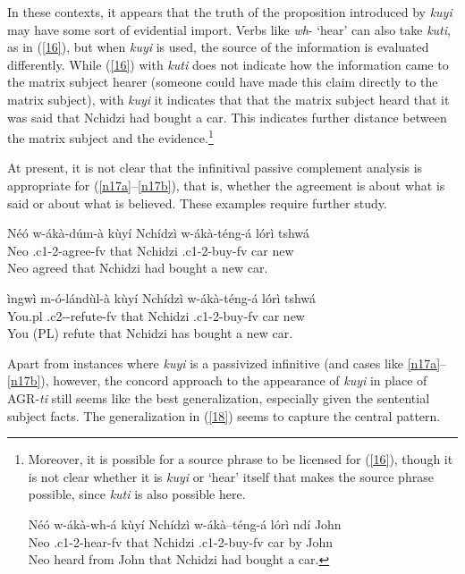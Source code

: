 \documentclass[output=paper,
modfonts
]{langscibook}
\begin{document}
In these contexts, it appears that the truth of the proposition introduced by \textit{kuyi} may have some sort of evidential import. Verbs like \textit{wh}- `hear' can also take \textit{kuti}, as in (\ref{16}), but when \textit{kuyi} is used, the source of the information is evaluated differently. While (\ref{16}) with \textit{kuti} does not indicate how the information came to the matrix subject hearer (someone could have made this claim directly to the matrix subject), with \textit{kuyi} it indicates that that the matrix subject heard that it was said that Nchidzi had bought a car. This indicates further distance between the matrix subject and the evidence.\footnote{Moreover, it is possible for a source phrase to be licensed for (\ref{16}), though it is not clear whether it is \textit{kuyi} or `hear' itself that makes the source phrase possible, since \textit{kuti} is also possible here. 

\ea \gll Néó w-ákà-wh-á kùyí Nchídzì  w-ákà–téng-á lórì ndí  John\\
Neo .c1-2-hear-fv	that Nchidzi .c1-2-buy-fv car by John\\
\glt Neo heard from John that Nchidzi had bought a car. \z 
} 

At present, it is not clear that the infinitival passive complement analysis is appropriate for (\ref{n17a}--\ref{n17b}), that is, whether the agreement is about what is said or about what is believed. These examples require further study. 

\ea\label{n17} 
\ea \label{n17a} \gll Néó w-ákà-dúm-à kùyí Nchídzì w-ákà-téng-á lórì tshwá\\
	Neo	.c1-2-agree-fv that  Nchidzi  .c1-2-buy-fv car new\\
	\glt Neo agreed that Nchidzi had bought a new car.

\ex\label{n17b}  \gll ìngwì 	m-ó-lándùl-à kùyí Nchídzì  w-ákà-téng-á lórì tshwá\\
	You.pl .c2--refute-fv that Nchidzi  .c1-2-buy-fv car new\\
	\glt You (PL) refute that Nchidzi has bought a new car.  \z \z  


Apart from instances where \textit{kuyi} is a passivized infinitive (and cases like \ref{n17a}--\ref{n17b}), however, the concord approach to the appearance of \textit{kuyi} in place of AGR-\textit{ti} still seems like the best generalization, especially given the sentential subject facts. The generalization in (\ref{18}) seems to capture the central pattern.
\end{document}

